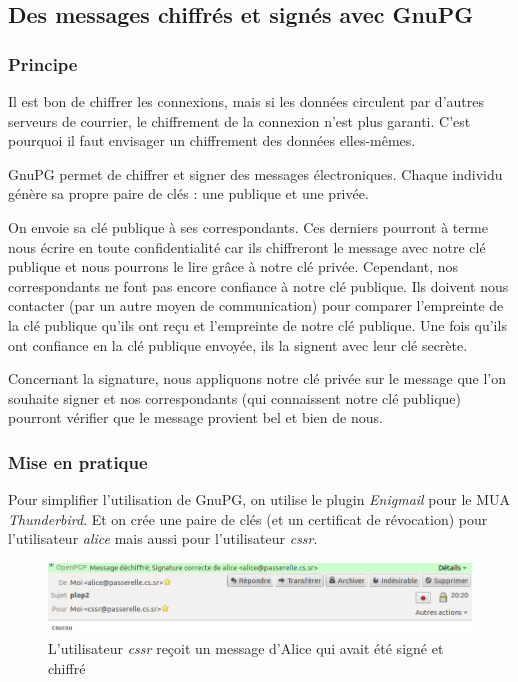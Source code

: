 \documentclass[a4paper]{article}
\begin{document}
\subsection{Des messages chiffrés et signés avec GnuPG}

\subsubsection{Principe}

Il est bon de chiffrer les connexions, mais si les données
circulent par d'autres serveurs de courrier, le chiffrement
de la connexion n'est plus garanti. C'est pourquoi il faut 
envisager un chiffrement des données elles-mêmes. 

GnuPG permet de chiffrer et signer des messages électroniques. 
Chaque individu génère sa propre paire de clés : une publique et une privée.

On envoie sa clé publique à ses correspondants. Ces derniers pourront à 
terme nous écrire en toute confidentialité car ils chiffreront le message 
avec notre clé publique et nous
pourrons le lire grâce à notre clé privée.
Cependant, nos correspondants ne font pas encore confiance à notre clé publique. 
Ils doivent nous contacter (par un autre moyen de 
communication) pour comparer l'empreinte de la clé publique qu'ils ont reçu et l'empreinte
de notre clé publique. Une fois qu'ils ont confiance en la clé publique envoyée,
ils la signent avec leur clé secrète. 


Concernant la signature, nous appliquons notre clé privée sur le message que l'on souhaite
signer et nos correspondants (qui connaissent notre clé publique) pourront
vérifier que le message provient bel et bien de nous.

\subsubsection{Mise en pratique}

Pour simplifier l'utilisation de GnuPG, on utilise le plugin \textit{Enigmail} pour le MUA
\textit{Thunderbird}. Et on crée une paire de clés (et un certificat de révocation)
pour l'utilisateur \textit{alice} mais aussi pour l'utilisateur \textit{cssr}.


\begin{figure}[!ht]
	\centering
	\includegraphics[scale=.5]{pgp.png}
	\caption{\label{pgp} L'utilisateur \textit{cssr} reçoit un message d'Alice qui avait été signé et chiffré}
\end{figure}
\end{document}
